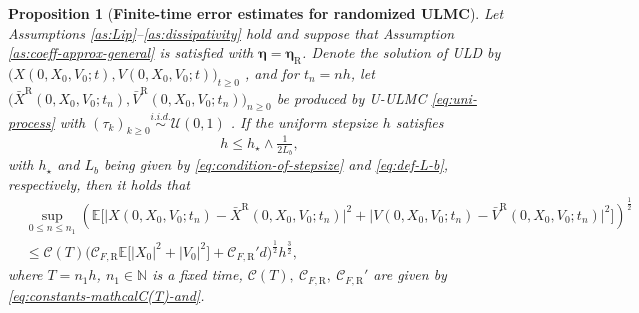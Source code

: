 \documentclass[12pt]{article}
\numberwithin{equation}{section}
\newtheorem{prop}{Proposition}[section]
\begin{document}
\begin{prop}[\textbf{Finite-time error estimates for randomized ULMC}]
\label{prop:finite-error-rs}
%
Let Assumptions \ref{as:Lip}--\ref{as:dissipativity} hold and suppose that Assumption \ref{as:coeff-approx-general} is satisfied with $\boldsymbol{\eta}=\boldsymbol{\eta}_\mathrm{R}$. 
Denote the solution of ULD by
\(
\big(X(0,X_0,V_0;t),V(0,X_0,V_0;t)\big)_{t\ge 0}
\) 
, and for $t_n=nh$, 
let
\(
\big(\bar X^{\mathrm{R}}(0,X_0,V_0;t_n),\bar V^{\mathrm{R}}(0,X_0,V_0;t_n)\big)_{n\geq0}
\)
be produced by U-ULMC \eqref{eq:uni-process} with $(\tau_k)_{k\ge 0}\overset{i.i.d.}{\sim} \mathcal{U}(0,1)$
. 
If the uniform stepsize $h$ satisfies 
\begin{equation}
\label{eq:final-condition-of-stepsize}
h \le  h_\star \wedge 
\tfrac1{2L_b},
\end{equation}
with \(h_\star\)  and \(L_b\) being given by \eqref{eq:condition-of-stepsize} and \eqref{eq:def-L-b}, respectively, 
then it holds that
\begin{equation}
\label{eq:sup-second-monent-er-finite-time}
\begin{aligned}
&
\sup_{0\leq n\leq n_1}
\left(
\mathbb E
\Big[
\big|X(0,X_0,V_0;t_n)
-
\bar X^{\mathrm{R}}(0,X_0,V_0;t_n)
\big|^2
+
\big|V(0,X_0,V_0;t_n)
-\bar V^{\mathrm{R}}(0,X_0,V_0;t_n)
\big|^2
\Big]
\right)^{\frac{1}{2}}
\\
&\leq
\mathcal C(T)
\Big(
\mathcal C_{F,\mathrm{R}}
\mathbb E
\big[
|X_0|^2+|V_0|^2
\big]
+
\mathcal C_{F,\mathrm{R}}' d
\Big)^{\frac{1}{2}}
h^{\frac{3}{2}},
\end{aligned}
\end{equation}
where \(T=n_1h\), \(n_1\in\mathbb N\) is a fixed time,  \(\mathcal C(T), \ \mathcal C_{F,\mathrm{R}}, \  \mathcal C_{F,\mathrm{R}}'\) are given by \eqref{eq:constants-mathcalC(T)-and}.
\end{prop}
\end{document}
